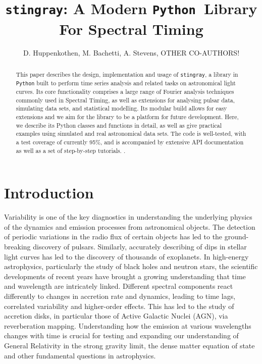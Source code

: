 \documentclass[12pt]{emulateapj}
\newcommand{\stingray}{\texttt{stingray}\xspace}
\newcommand{\python}{\texttt{Python}\xspace}
\begin{document}
\title{\stingray: A Modern \python\ Library For Spectral Timing}

\author{D. Huppenkothen, M. Bachetti, A. Stevens\altaffilmark{}, OTHER CO-AUTHORS!}
 


\begin{abstract}
This paper describes the design, implementation and usage of \stingray, a library in \python built to perform time series analysis and related tasks on astronomical light curves. 
Its core functionality comprises a large range of Fourier analysis techniques commonly used in Spectral Timing, as well as extensions for analysing pulsar data, simulating data sets, and statistical modelling. 
Its modular build allows for easy extensions and we aim for the library to be a platform for future development. 
Here, we describe its Python classes and functions in detail, as well as give practical examples using simulated and real astronomical data sets. 
The code is well-tested, with a test coverage of currently 95\%, and is accompanied by extensive API documentation as well as a set of step-by-step tutorials. .

\end{abstract}


\section{Introduction}

Variability is one of the key diagnostics in understanding the underlying physics of the dynamics and emission processes from astronomical objects. 
The detection of periodic variations in the radio flux of certain objects has led to the ground-breaking discovery of pulsars. Similarly, accurately describing of dips in stellar light curves has led to the discovery of thousands of exoplanets. 
In high-energy astrophysics, particularly the study of black holes and neutron stars, the scientific developments of recent years have brought a growing understanding that time and wavelength are intricately linked. 
Different spectral components react differently to changes in accretion rate and dynamics, leading to time lags, correlated variability and higher-order effects. 
This has led to the study of accretion disks, in particular those of Active Galactic Nuclei (AGN), via reverberation mapping. 
Understanding how the emission at various wavelengths changes with time is crucial for testing and expanding our understanding of General Relativity in the strong gravity limit, the dense matter equation of state and other fundamental questions in astrophysics.
\end{document}
